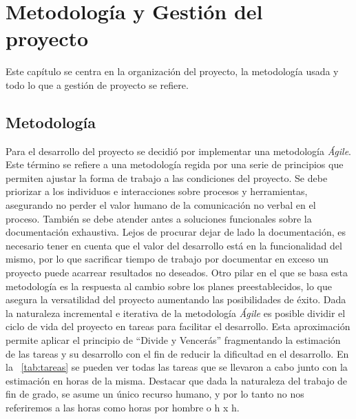 \chapter{Metodología y Gestión del proyecto}
\label{chap:mygp}
Este capítulo se centra en la organización del proyecto, la metodología usada y todo lo que a gestión de proyecto se refiere.
\section{Metodología}
Para el desarrollo del proyecto se decidió por implementar una metodología \textit{Ágile}. Este término se refiere a una metodología regida por una serie de principios que permiten ajustar la forma de trabajo a las condiciones del proyecto. Se debe priorizar a los individuos e interacciones sobre procesos y herramientas, asegurando no perder el valor humano de la comunicación no verbal en el proceso. También se debe atender antes a soluciones funcionales sobre la documentación exhaustiva. Lejos de procurar dejar de lado la documentación, es necesario tener en cuenta que el valor del desarrollo está en la funcionalidad del mismo, por lo que sacrificar tiempo de trabajo por documentar en exceso un proyecto puede acarrear resultados no deseados.
Otro pilar en el que se basa esta metodología es la respuesta al cambio sobre los planes preestablecidos, lo que asegura la versatilidad del proyecto aumentando las posibilidades de éxito.
Dada la naturaleza incremental e iterativa de la metodología \textit{Ágile} es posible dividir el ciclo de vida del proyecto en tareas para facilitar el desarrollo. Esta aproximación permite aplicar el principio de ``Divide y Vencerás'' fragmentando la estimación de las tareas y su desarrollo con el fin de reducir la dificultad en el desarrollo. En la \tablename~\ref{tab:tareas} se pueden ver todas las tareas que se llevaron a cabo junto con la estimación en horas de la misma. Destacar que dada la naturaleza del trabajo de fin de grado, se asume un único recurso humano, y por lo tanto no nos referiremos a las horas como horas por hombre o h x h.

